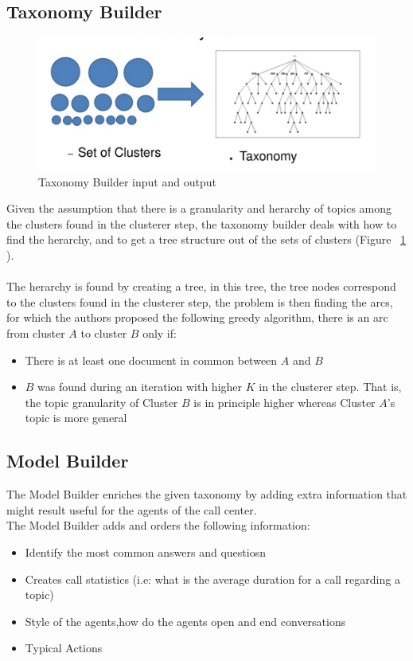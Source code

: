\documentclass[4pt,a4paper]{article}
\begin{document}
\subsection{Taxonomy Builder}

\begin{figure}[]
  \centering
    \includegraphics[scale=0.2]{pics/taxonomyBuilder.jpg}
    \caption{Taxonomy Builder input and output}
   \label{fig:taxonomyBuilder}  
\end{figure}

Given the assumption that there is a granularity and herarchy of topics among the clusters found in the clusterer step, the taxonomy builder deals with  how to find the herarchy, and to get a tree structure out of the sets of clusters (Figure ~\ref{fig:taxonomyBuilder} ).\\
\\
The herarchy is found by creating a tree, in this tree, the tree nodes correspond to the clusters found in the clusterer step, the problem is then finding the arcs, for which the authors proposed the following greedy algorithm, there is an arc from cluster $A$ to cluster $B$ only if:
\begin{itemize}
	\item  There is at least one document in common between $A$ and $B$
	\item  $B$ was found during an iteration with higher $K$ in the clusterer step. That is, the topic granularity of Cluster $B$ is in principle higher whereas Cluster $A$'s topic is more general
\end{itemize}


\subsection{Model Builder}
The Model Builder enriches the given taxonomy by adding extra information that might result useful for the 
agents of the call center.\\
The Model Builder adds and orders the following information:
\begin{itemize}
	\item Identify the most common answers and questiosn
	\item Creates call statistics (i.e: what is the average duration for a call regarding a topic)
	\item Style of the agents,how do the agents open and end conversations
	\item Typical Actions
\end{itemize}
\end{document}
